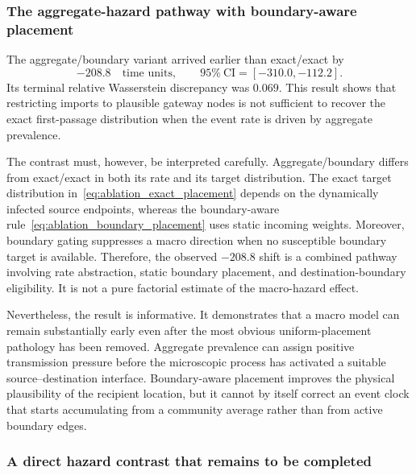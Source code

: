 \subsubsection{The aggregate-hazard pathway with boundary-aware placement}
\label{sec:hazard_placement_result_aggregate}

The aggregate/boundary variant arrived earlier than exact/exact by
\[
-208.8
\quad\text{time units},
\qquad
95\%\ \mathrm{CI}=[-310.0,-112.2].
\]
Its terminal relative Wasserstein discrepancy was $0.069$.  This result shows that restricting imports to plausible gateway nodes is not sufficient to recover the exact first-passage distribution when the event rate is driven by aggregate prevalence.

The contrast must, however, be interpreted carefully.  Aggregate/boundary differs from exact/exact in both its rate and its target distribution.  The exact target distribution in~\eqref{eq:ablation_exact_placement} depends on the dynamically infected source endpoints, whereas the boundary-aware rule~\eqref{eq:ablation_boundary_placement} uses static incoming weights.  Moreover, boundary gating suppresses a macro direction when no susceptible boundary target is available.  Therefore, the observed $-208.8$ shift is a combined pathway involving rate abstraction, static boundary placement, and destination-boundary eligibility.  It is not a pure factorial estimate of the macro-hazard effect.

Nevertheless, the result is informative.  It demonstrates that a macro model can remain substantially early even after the most obvious uniform-placement pathology has been removed.  Aggregate prevalence can assign positive transmission pressure before the microscopic process has activated a suitable source--destination interface.  Boundary-aware placement improves the physical plausibility of the recipient location, but it cannot by itself correct an event clock that starts accumulating from a community average rather than from active boundary edges.

\subsubsection{A direct hazard contrast that remains to be completed}
\label{sec:hazard_placement_direct_hazard}

